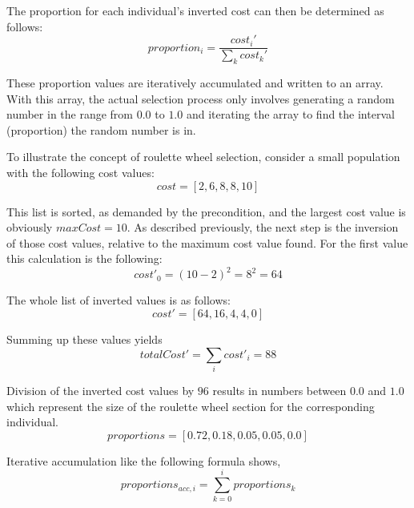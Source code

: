 \documentclass[english,examples]{isasthesis}
\begin{document}
The proportion for each individual's inverted cost can then be determined as
follows:
\begin{equation}
    proportion_i = \frac{cost_i'}{\sum_{k} cost_k'}
\end{equation}

These proportion values are iteratively accumulated and written to an array.
With this array, the actual selection process only involves generating a
random number in the range from $0.0$ to $1.0$ and iterating the array to find
the interval (proportion) the random number is in.

\begin{Example}
    To illustrate the concept of roulette wheel selection,
    consider a small population with the following cost values:
    \begin{equation}
        cost = [ 2, 6, 8, 8, 10 ]
    \end{equation}

    This list is sorted, as demanded by the precondition, and the largest cost
    value is obviously $maxCost = 10$. As described previously, the next step
    is the inversion of those cost values, relative to the maximum cost value
    found. For the first value this calculation is the following:
    \begin{equation}
        cost'_0 = (10-2)^2 = 8^2 = 64
    \end{equation}

    The whole list of inverted values is as follows:
    \begin{equation}
        cost' = [ 64, 16, 4, 4, 0 ]
    \end{equation}

    Summing up these values yields
    \begin{equation}
        totalCost' = \sum_{i} cost'_i = 88
    \end{equation}

    Division of the inverted cost values by $96$ results in numbers between
    $0.0$ and $1.0$ which represent the size of the roulette wheel section for
    the corresponding individual.
    \begin{equation}
        proportions = [0.72, 0.18, 0.05, 0.05, 0.0]
    \end{equation}

    Iterative accumulation like the following formula shows,
    \begin{equation}
        proportions_{acc,i} = \sum_{k=0}^{i} proportions_k
    \end{equation}


\end{Example}
\end{document}

